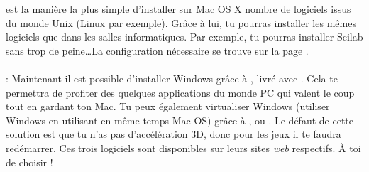 \label{mac-fink}
  est la mani\`ere la plus simple d'installer sur Mac OS X nombre de logiciels issus du monde Unix (Linux par exemple). Gr\^ace \`a  lui, tu pourras installer les m\^emes logiciels que dans les salles informatiques. Par exemple, tu pourras installer Scilab sans trop de peine\dots La configuration n\'ecessaire se trouve sur la page .

\paragraph{}
  : Maintenant il est possible d'installer Windows gr\^ace \`a  , livr\'e avec . Cela te permettra de profiter des quelques applications du monde PC qui valent le coup tout en gardant ton Mac. Tu peux \'egalement virtualiser Windows (utiliser Windows en utilisant en m\^eme temps Mac OS) gr\^ace \`a  ,  ou . Le  d\'efaut de cette solution est que tu n'as pas d'acc\'el\'eration 3D, donc pour les jeux il te faudra red\'emarrer. Ces trois logiciels sont disponibles sur leurs sites \emph{web} respectifs. \`A toi de choisir !

\clearpage
